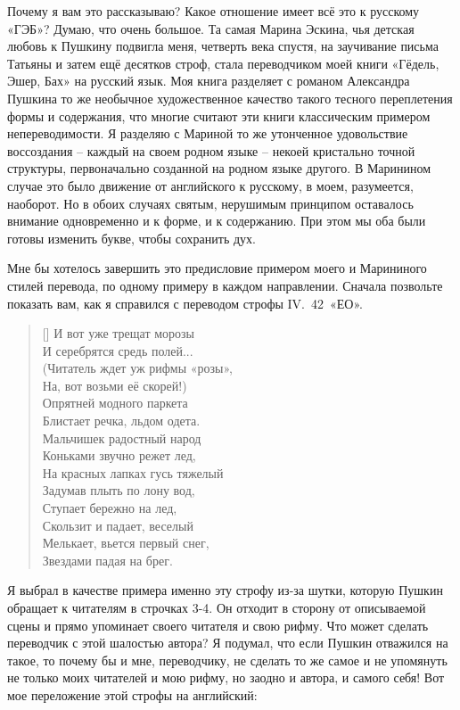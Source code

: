 \documentclass[../main.tex]{subfiles}
\begin{document}
Почему я вам это рассказываю? Какое отношение имеет всё это к русскому «ГЭБ»? Думаю, что очень большое. Та самая Марина Эскина, чья детская любовь к Пушкину подвигла меня, четверть века спустя, на заучивание письма Татьяны и затем ещё десятков строф, стала переводчиком моей книги «Гёдель, Эшер, Бах» на русский язык. Моя книга разделяет с романом Александра Пушкина то же необычное художественное качество такого тесного переплетения формы и содержания, что многие считают эти книги классическим примером непереводимости. Я разделяю с Мариной то же утонченное удовольствие воссоздания \--- каждый на своем родном языке \--- некоей кристально точной структуры, первоначально созданной на родном языке другого. В Маринином случае это было движение от английского к русскому, в моем, разумеется, наоборот. Но в обоих случаях святым, нерушимым принципом оставалось внимание одновременно и к форме, и к содержанию. При этом мы оба были готовы изменить букве, чтобы сохранить дух.

Мне бы хотелось завершить это предисловие примером моего и Марининого стилей перевода, по одному примеру в каждом направлении. Сначала позвольте показать вам, как я справился с переводом строфы IV.~42~«ЕО».

\settowidth{\versewidth}{Читатель ждет уж рифмы «розы»,}
\begin{verse}[\versewidth]
    И вот уже трещат морозы \\
    И серебрятся средь полей... \\
    (Читатель ждет уж рифмы «розы», \\
    На, вот возьми её скорей!) \\
    Опрятней модного паркета \\
    Блистает речка, льдом одета. \\
    Мальчишек радостный народ \\
    Коньками звучно режет лед, \\
    На красных лапках гусь тяжелый \\
    Задумав плыть по лону вод, \\
    Ступает бережно на лед, \\
    Скользит и падает, веселый \\
    Мелькает, вьется первый снег, \\
    Звездами падая на брег.
\end{verse}

Я выбрал в качестве примера именно эту строфу из-за шутки, которую Пушкин обращает к читателям в строчках 3-4. Он отходит в сторону от описываемой сцены и прямо упоминает своего читателя и свою рифму. Что может сделать переводчик с этой шалостью автора? Я подумал, что если Пушкин отважился на такое, то почему бы и мне, переводчику, не сделать то же самое и не упомянуть не только моих читателей и мою рифму, но заодно и автора, и самого себя! Вот мое переложение этой строфы на английский:
\end{document}
